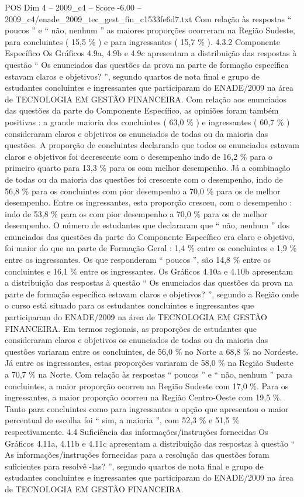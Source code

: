 \begin{textsample}{POS Dim 4 – 2009\_c4 – Score -6.00 – 2009\_c4/enade\_2009\_tec\_gest\_fin\_c1533fe6d7.txt}
Com relação às respostas “ poucos ” e “ não, nenhum ” as maiores proporções ocorreram na Região Sudeste, para concluintes ( 15,5 \% ) e para ingressantes ( 15,7 \% ). 4.3.2 Componente Específico Os Gráficos 4.9a, 4.9b e 4.9c apresentam a distribuição das respostas à questão “ Os enunciados das questões da prova na parte de formação específica estavam claros e objetivos? ”, segundo quartos de nota final e grupo de estudantes concluintes e ingressantes que participaram do ENADE/2009 na área de TECNOLOGIA EM GESTÃO FINANCEIRA.
Com relação aos enunciados das questões da parte do Componente Específico, as opiniões foram também positivas : a grande maioria dos concluintes ( 63,0 \% ) e ingressantes ( 60,7 \% ) consideraram claros e objetivos os enunciados de todas ou da maioria das questões.
A proporção de concluintes declarando que todos os enunciados estavam claros e objetivos foi decrescente com o desempenho indo de 16,2 \% para o primeiro quarto para 13,3 \% para os com melhor desempenho.
Já a combinação de todas ou da maioria das questões foi crescente com o desempenho, indo de 56,8 \% para os concluintes com pior desempenho a 70,0 \% para os de melhor desempenho.
Entre os ingressantes, esta proporção cresceu, com o desempenho : indo de 53,8 \% para os com pior desempenho a 70,0 \% para os de melhor desempenho.
O número de estudantes que declararam que “ não, nenhum ” dos enunciados das questões da parte do Componente Específico era claro e objetivo, foi maior do que na parte de Formação Geral : 1,4 \% entre os concluintes e 1,9 \% entre os ingressantes.
Os que responderam “ poucos ”, são 14,8 \% entre os concluintes e 16,1 \% entre os ingressantes.
Os Gráficos 4.10a e 4.10b apresentam a distribuição das respostas à questão “ Os enunciados das questões da prova na parte de formação específica estavam claros e objetivos? ”, segundo a Região onde o curso está situado para os estudantes concluintes e ingressantes que participaram do ENADE/2009 na área de TECNOLOGIA EM GESTÃO FINANCEIRA.
Em termos regionais, as proporções de estudantes que consideraram claros e objetivos os enunciados de todas ou da maioria das questões variaram entre os concluintes, de 56,0 \% no Norte a 68,8 \% no Nordeste.
Já entre os ingressantes, estas proporções variaram de 58,0 \% na Região Sudeste a 70,7 \% na Norte.
Com relação às respostas “ poucos ” e “ não, nenhum ” para concluintes, a maior proporção ocorreu na Região Sudeste com 17,0 \%.
Para os ingressantes, a maior proporção ocorreu na Região Centro-Oeste com 19,5 \%.
Tanto para concluintes como para ingressantes a opção que apresentou o maior percentual de escolha foi “ sim, a maioria ”, com 52,3 \% e 51,5 \% respectivamente. 4.4 Suficiência das informações/instruções fornecidas Os Gráficos 4.11a, 4.11b e 4.11c apresentam a distribuição das respostas à questão “ As informações/instruções fornecidas para a resolução das questões foram suficientes para resolvê -las? ”, segundo quartos de nota final e grupo de estudantes concluintes e ingressantes que participaram do ENADE/2009 na área de TECNOLOGIA EM GESTÃO FINANCEIRA.

\end{textsample}
